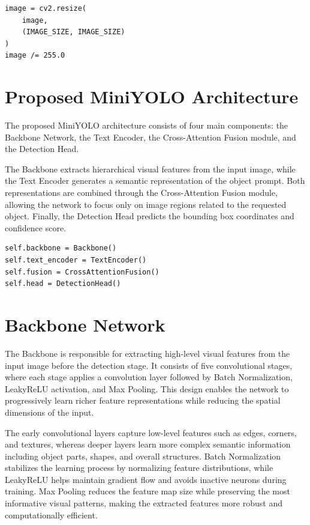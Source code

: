 \documentclass[a4paper,12pt]{report}
\begin{document}
\begin{lstlisting}[caption={Image preprocessing}, label={lst:tgod-image-preprocessing}]
image = cv2.resize(
    image,
    (IMAGE_SIZE, IMAGE_SIZE)
)
image /= 255.0
\end{lstlisting}

\section{Proposed MiniYOLO Architecture}
\label{sec:tgod-architecture}

The proposed MiniYOLO architecture consists of four main components: the
Backbone Network, the Text Encoder, the Cross-Attention Fusion module, and
the Detection Head.

The Backbone extracts hierarchical visual features from the input image,
while the Text Encoder generates a semantic representation of the object
prompt. Both representations are combined through the Cross-Attention
Fusion module, allowing the network to focus only on image regions related
to the requested object. Finally, the Detection Head predicts the bounding
box coordinates and confidence score.

\begin{lstlisting}[caption={Model architecture}, label={lst:tgod-model-architecture}]
self.backbone = Backbone()
self.text_encoder = TextEncoder()
self.fusion = CrossAttentionFusion()
self.head = DetectionHead()
\end{lstlisting}

\section{Backbone Network}
\label{sec:tgod-backbone}

The Backbone is responsible for extracting high-level visual features from
the input image before the detection stage. It consists of five
convolutional stages, where each stage applies a convolution layer
followed by Batch Normalization, LeakyReLU activation, and Max Pooling.
This design enables the network to progressively learn richer feature
representations while reducing the spatial dimensions of the input.

The early convolutional layers capture low-level features such as edges,
corners, and textures, whereas deeper layers learn more complex semantic
information including object parts, shapes, and overall structures. Batch
Normalization stabilizes the learning process by normalizing feature
distributions, while LeakyReLU helps maintain gradient flow and avoids
inactive neurons during training. Max Pooling reduces the feature map size
while preserving the most informative visual patterns, making the
extracted features more robust and computationally efficient.
\end{document}
